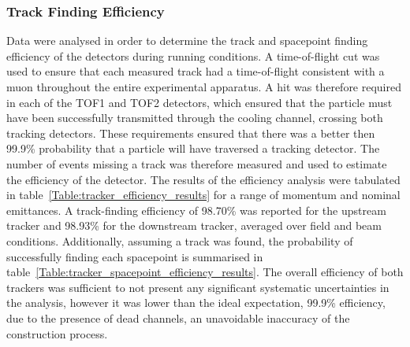 \subsubsection{Track Finding Efficiency}
\label{trackers:performance:efficiency}
Data were analysed in order to determine the track and spacepoint finding efficiency of the detectors during running conditions. A time-of-flight cut was used to ensure that each measured track had a time-of-flight consistent with a muon throughout the entire experimental apparatus. A hit was therefore required in each of the TOF1 and TOF2 detectors, which ensured that the particle must have been successfully transmitted through the cooling channel, crossing both tracking detectors. These requirements ensured that there was a better then 99.9\% probability that a particle will have traversed a tracking detector.
The number of events missing a track was therefore measured and used to estimate the efficiency of the detector.
The results of the efficiency analysis were tabulated in table~\ref{Table:tracker_efficiency_results} for a range of momentum and nominal emittances. A track-finding efficiency of 98.70\% was reported for the upstream tracker and 98.93\% for the downstream tracker, averaged over field and beam conditions. Additionally, assuming a track was found, the probability of successfully finding each spacepoint is summarised in table~\ref{Table:tracker_spacepoint_efficiency_results}. The overall efficiency of both trackers was sufficient to not present any significant systematic uncertainties in the analysis, however it was lower than the ideal expectation, 99.9\% efficiency, due to the presence of dead channels, an unavoidable inaccuracy of the construction process.

